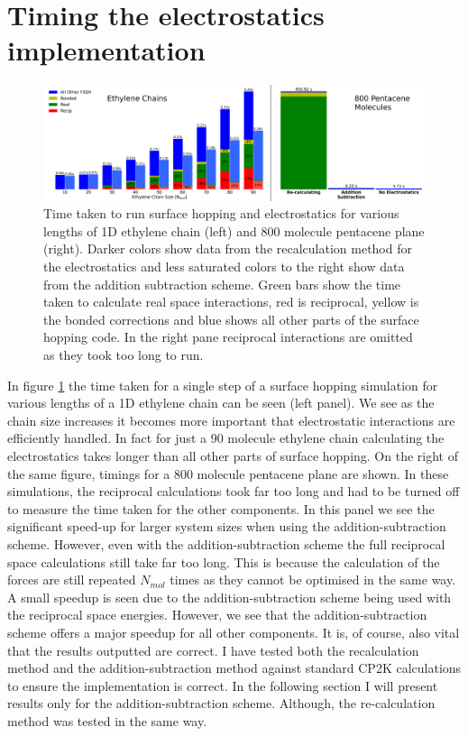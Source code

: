\section{Timing the electrostatics implementation}
\begin{figure}[ht]
  \includegraphics[width=\textwidth]{../img/ES/TimingsReCalc_vs_AddSub.png}
  \caption{\label{fig:AddSubTimings}Time taken to run surface hopping and electrostatics for various lengths of 1D ethylene chain (left) and 800 molecule pentacene plane (right). Darker colors show data from the recalculation method for the electrostatics and less saturated colors to the right show data from the addition subtraction scheme. Green bars show the time taken to calculate real space interactions, red is reciprocal, yellow is the bonded corrections and blue shows all other parts of the surface hopping code. In the right pane reciprocal interactions are omitted as they took too long to run.}
\end{figure}
\noindent In figure \ref{fig:AddSubTimings} the time taken for a single step of a surface hopping simulation for various lengths of a 1D ethylene chain can be seen (left panel). We see as the chain size increases it becomes more important that electrostatic interactions are efficiently handled. In fact for just a 90 molecule ethylene chain calculating the electrostatics takes longer than all other parts of surface hopping. On the right of the same figure, timings for a 800 molecule pentacene plane are shown. In these simulations, the reciprocal calculations took far too long and had to be turned off to measure the time taken for the other components. In this panel we see the significant speed-up for larger system sizes when using the addition-subtraction scheme. However, even with the addition-subtraction scheme the full reciprocal space calculations still take far too long. This is because the calculation of the forces are still repeated $N_{mol}$ times as they cannot be optimised in the same way. A small speedup is seen due to the addition-subtraction scheme being used with the reciprocal space energies. However, we see that the addition-subtraction scheme offers a major speedup for all other components. It is, of course, also vital that the results outputted are correct. I have tested both the recalculation method and the addition-subtraction method against standard CP2K calculations to ensure the implementation is correct. In the following section I will present results only for the addition-subtraction scheme. Although, the re-calculation method was tested in the same way.

